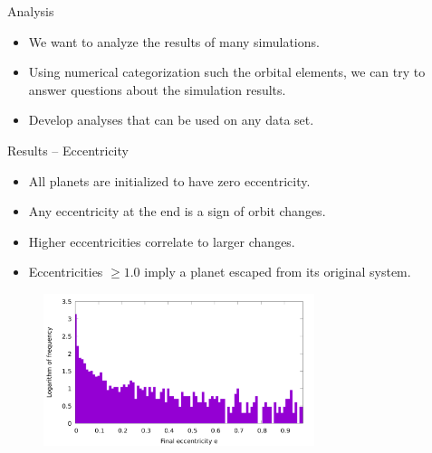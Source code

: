 \documentclass{beamer}
\begin{document}

\begin{frame}{Analysis}
    \begin{itemize}
        \item We want to analyze the results of many
            simulations.
        \item Using numerical categorization such the orbital elements,
            we can try to answer questions about the simulation results.
        \item Develop analyses that can be used on any data set.
    \end{itemize}
\end{frame}

\begin{frame}{Results -- Eccentricity}
    \begin{itemize}
        \item All planets are initialized to have zero eccentricity.
        \item Any eccentricity at the end is a sign of orbit changes.
        \item Higher eccentricities correlate to larger changes.
        \item Eccentricities $\ge 1.0$ imply a planet escaped from its
            original system.
    \end{itemize}
    \begin{figure}
        \centering
        \includegraphics[height=1.75in]{eccentricity_final}
    \end{figure}
\end{frame}
\end{document}
